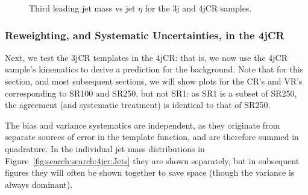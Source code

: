 \begin{figure}[!ht]
  \centering
  

    
  \caption{Third leading jet mass vs jet $\eta$ for the 3j and 4jCR samples.}
           
  \label{fig:search:search:kincorrelations:meta2}
\end{figure}

















\subsubsection{Reweighting, and Systematic Uncertainties, in the 4jCR}

Next, we test the 3jCR templates in the 4jCR: that is, we now use the 4jCR sample's kinematics to derive a prediction for the \MJ background. Note that for this section, and most subsequent sections, we will show plots for the CR's and VR's corresponding to SR100 and SR250, but not SR1: as SR1 is a subset of SR250, the agreement (and systematic treatment) is identical to that of SR250.

The bias and variance systematics are independent, as they originate from separate sources of error in the template function, and are therefore summed in quadrature. In the individual jet mass distributions in Figure~\ref{fig:search:search:4jcr:Jets} they are shown separately, but in subsequent figures they will often be shown together to save space (though the variance is always dominant).


